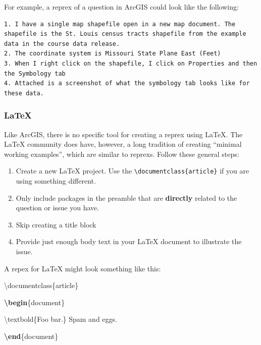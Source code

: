 \documentclass[]{book}
\newenvironment{Shaded}{\begin{snugshade}}{\end{snugshade}}
\newcommand{\KeywordTok}[1]{\textcolor[rgb]{0.13,0.29,0.53}{\textbf{#1}}}
\newcommand{\FunctionTok}[1]{\textcolor[rgb]{0.00,0.00,0.00}{#1}}
\newcommand{\BuiltInTok}[1]{#1}
\newcommand{\ExtensionTok}[1]{#1}
\newcommand{\NormalTok}[1]{#1}
\providecommand{\tightlist}{%
  \setlength{\itemsep}{0pt}\setlength{\parskip}{0pt}}
\theoremstyle{definition}
\theoremstyle{definition}
\theoremstyle{definition}
\theoremstyle{remark}
\begin{document}
For example, a reprex of a question in ArcGIS could look like the
following:

\begin{verbatim}
1. I have a single map shapefile open in a new map document. The shapefile is the St. Louis census tracts shapefile from the example data in the course data release.
2. The coordinate system is Missouri State Plane East (Feet)
3. When I right click on the shapefile, I click on Properties and then the Symbology tab
4. Attached is a screenshot of what the symbology tab looks like for these data.
\end{verbatim}

\subsubsection{LaTeX}\label{latex}

Like ArcGIS, there is no specific tool for creating a reprex using
LaTeX. The LaTeX community does have, however, a long tradition of
creating ``minimal working examples'', which are similar to reprexs.
Follow these general steps:

\begin{enumerate}
\def\labelenumi{\arabic{enumi}.}
\tightlist
\item
  Create a new LaTeX project. Use the
  \texttt{\textbackslash{}documentclass\{article\}} if you are using
  something different.
\item
  Only include packages in the preamble that are \textbf{directly}
  related to the question or issue you have.
\item
  Skip creating a title block
\item
  Provide just enough body text in your LaTeX document to illustrate the
  issue.
\end{enumerate}

A repex for LaTeX might look something like this:

\begin{Shaded}
\begin{Highlighting}[]
\BuiltInTok{\textbackslash{}documentclass}\NormalTok{\{}\ExtensionTok{article}\NormalTok{\}}

\KeywordTok{\textbackslash{}begin}\NormalTok{\{}\ExtensionTok{document}\NormalTok{\}}

\FunctionTok{\textbackslash{}textbold}\NormalTok{\{Foo bar.\} Spam and eggs.}

\KeywordTok{\textbackslash{}end}\NormalTok{\{}\ExtensionTok{document}\NormalTok{\}}
\end{Highlighting}
\end{Shaded}
\end{document}
